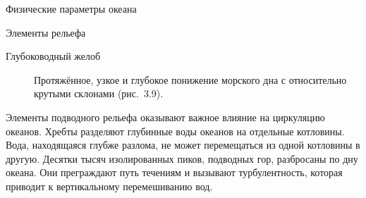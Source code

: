 \begin{chapter}{Физические параметры океана}
\begin{section}{Элементы рельефа}
\begin{description}
\item[Глубоководный желоб]
Протяжённое, узкое и глубокое понижение морского дна с относительно
крутыми склонами (рис.~3.9).
%
\end{description}

Элементы подводного рельефа оказывают важное влияние на циркуляцию
океанов. Хребты разделяют глубинные воды океанов на отдельные котловины. 
Вода, находящаяся глубже разлома, не
может перемещаться из одной котловины в другую. Десятки тысяч
изолированных пиков, подводных гор, разбросаны по дну океана. Они
преграждают путь течениям и вызывают турбулентность, которая приводит
к вертикальному перемешиванию вод.
%



\end{section}


\end{chapter}
